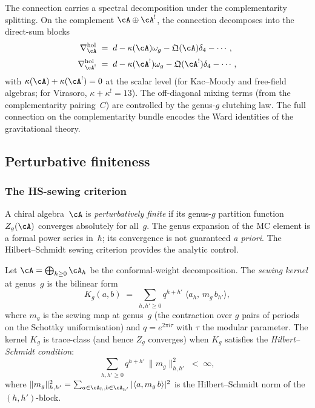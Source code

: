 The connection carries a spectral decomposition under the
complementarity splitting. On the complement
$\cA\oplus\cA^!$, the connection decomposes into the direct-sum
blocks
\begin{align*}
\nabla^{\mathrm{hol}}_\cA
&\;=\;
d-\kappa(\cA)\omega_g
-\mathfrak Q(\cA)\delta_4-\cdots\,,\\[2pt]
\nabla^{\mathrm{hol}}_{\cA^!}
&\;=\;
d-\kappa(\cA^!)\omega_g
-\mathfrak Q(\cA^!)\delta_4-\cdots\,,
\end{align*}
with $\kappa(\cA)+\kappa(\cA^!)=0$ at the scalar level
(for Kac--Moody and free-field algebras; for Virasoro,
$\kappa+\kappa^!=13$). The
off-diagonal mixing terms (from the complementarity pairing~$C$)
are controlled by the genus-$g$ clutching law. The full
connection on the complementarity bundle encodes the Ward
identities of the gravitational theory.


\subsection*{Perturbative finiteness}

\subsubsection*{The HS-sewing criterion}

A chiral algebra~$\cA$ is \emph{perturbatively finite} if its
genus-$g$ partition function $Z_g(\cA)$ converges absolutely for
all~$g$. The genus expansion of the MC element is a formal power
series in~$\hbar$; its convergence is not guaranteed \emph{a
priori}. The Hilbert--Schmidt sewing criterion provides the
analytic control.

Let $\cA=\bigoplus_{h\ge 0}\cA_h$ be the conformal-weight
decomposition. The \emph{sewing kernel} at genus~$g$ is the
bilinear form
\[
K_g(a,b)
\;=\;
\sum_{h,h'\ge 0}
q^{h+h'}\;\langle a_h,\,m_g\,b_{h'}\rangle,
\]
where $m_g$ is the sewing map at genus~$g$ (the contraction over
$g$ pairs of periods on the Schottky uniformisation) and
$q=e^{2\pi i\tau}$ with $\tau$ the modular parameter. The
kernel $K_g$ is trace-class (and hence $Z_g$ converges) when
$K_g$ satisfies the \emph{Hilbert--Schmidt condition}:
\begin{equation}\label{eq:hs-sewing-preface-supp}
\sum_{h,h'\ge 0}
q^{h+h'}\,\|m_g\|_{h,h'}^2
\;<\;\infty,
\end{equation}
where $\|m_g\|_{h,h'}^2=\sum_{a\in\cA_h,b\in\cA_{h'}}
|\langle a,m_g\,b\rangle|^2$ is the Hilbert--Schmidt norm of
the $(h,h')$-block.

